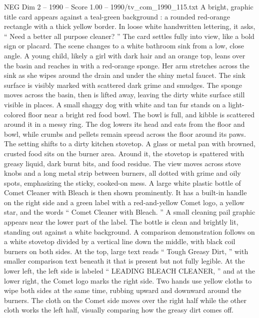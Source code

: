 \begin{textsample}{NEG Dim 2 – 1990 – Score 1.00 – 1990/tv\_com\_1990\_115.txt}  \label{ex:f2_neg_070}
A bright, graphic title card appears against a teal-green background : a rounded red-orange rectangle with a thick yellow border.
In loose white handwritten lettering, it asks, “ Need a better all purpose cleaner? ” The card settles fully into view, like a bold sign or placard.
The scene changes to a white bathroom sink from a low, close angle.
A young child, likely a girl with dark hair and an orange top, leans over the basin and reaches in with a red-orange sponge.
Her arm stretches across the sink as she wipes around the drain and under the shiny metal faucet.
The sink surface is visibly marked with scattered dark grime and smudges.
The sponge moves across the basin, then is lifted away, leaving the dirty white surface still visible in places.
A small shaggy dog with white and tan fur stands on a light-colored floor near a bright red food bowl.
The bowl is full, and kibble is scattered around it in a messy ring.
The dog lowers its head and eats from the floor and bowl, while crumbs and pellets remain spread across the floor around its paws.
The setting shifts to a dirty kitchen stovetop.
A glass or metal pan with browned, crusted food sits on the burner area.
Around it, the stovetop is spattered with greasy liquid, dark burnt bits, and food residue.
The view moves across stove knobs and a long metal strip between burners, all dotted with grime and oily spots, emphasizing the sticky, cooked-on mess.
A large white plastic bottle of Comet Cleaner with Bleach is then shown prominently.
It has a built-in handle on the right side and a green label with a red-and-yellow Comet logo, a yellow star, and the words “ Comet Cleaner with Bleach. ” A small cleaning pail graphic appears near the lower part of the label.
The bottle is clean and brightly lit, standing out against a white background.
A comparison demonstration follows on a white stovetop divided by a vertical line down the middle, with black coil burners on both sides.
At the top, large text reads “ Tough Greasy Dirt, ” with smaller comparison text beneath it that is present but not fully legible.
At the lower left, the left side is labeled “ LEADING BLEACH CLEANER, ” and at the lower right, the Comet logo marks the right side.
Two hands use yellow cloths to wipe both sides at the same time, rubbing upward and downward around the burners.
The cloth on the Comet side moves over the right half while the other cloth works the left half, visually comparing how the greasy dirt comes off.

\end{textsample}
